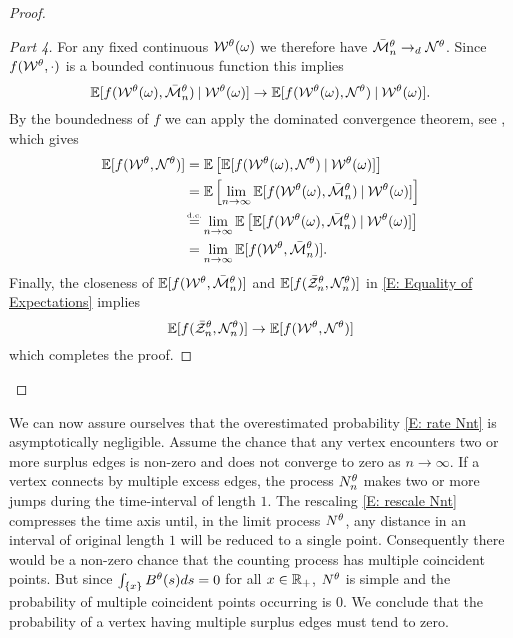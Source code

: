 \begin{proof}
\begin{proof}[Part 4]
For any fixed continuous $\mathcal{W}^{\theta}(\omega)$ we therefore have $\bar{\mathcal{M}}_n^{\theta} \rightarrow_d \mathcal{N}^{\theta}$.
Since $f(\mathcal{W}^{\theta}, \cdot)$ is a bounded continuous function this implies
\begin{equation*}
	\mathbb{E}[f(\mathcal{W}^{\theta}(\omega), \bar{\mathcal{M}}_n^{\theta}) \: | \: \mathcal{W}^{\theta}(\omega)] \rightarrow \mathbb{E}[f(\mathcal{W}^{\theta}(\omega), \mathcal{N}^{\theta})\: | \: \mathcal{W}^{\theta}(\omega)].
\end{equation*}
By the boundedness of $f$ we can apply the dominated convergence theorem, see \cite[Corollary 6.26, p.135]{Klenke.2006}, which gives
\begin{equation*}
	\begin{aligned}
	\ExpSm{f(\WtX, \NtX)}
	&= \Exp{ \ExpSm{f(\WtX(\omega), \NtX) \cond \WtX(\omega)} } \\
	&= \Exp{ \lim_{n\rightarrow\infty} \ExpSm{f(\WtX(\omega), \rNdisX) \cond \WtX(\omega)} } \\
	&\myeq{d.c.} \lim_{n\rightarrow\infty} \Exp{ \ExpSm{f(\WtX(\omega), \rNdisX) \cond \WtX(\omega)} } \\
	&= \lim_{n\rightarrow\infty} \ExpSm{ f(\WtX, \rNdisX) }.
	\end{aligned}
\end{equation*}
Finally, the closeness of $\mathbb{E}[ f(\mathcal{W}^{\theta}, \bar{\mathcal{M}}_n^{\theta}) ]$ and $\mathbb{E}[f(\bar{\mathcal{Z}}^{\theta}_n, \mathcal{N}_n^{\theta})]$ in \eqref{E: Equality of Expectations} implies
\begin{equation*}
	\mathbb{E}[f(\bar{\mathcal{Z}}^{\theta}_n, \mathcal{N}_n^{\theta})] \rightarrow \mathbb{E}[f(\mathcal{W}^{\theta}, \mathcal{N}^{\theta})]
\end{equation*}
which completes the proof.
\end{proof}
\phantom\qedhere
\end{proof}

\bigskip

We can now assure ourselves that the overestimated probability \eqref{E: rate Nnt} is asymptotically negligible.
Assume the chance that any vertex encounters two or more surplus edges is non-zero and does not converge to zero as $n \rightarrow \infty$.
If a vertex connects by multiple excess edges, the process $N_n^{\theta}$ makes two or more jumps during the time-interval of length $1$.
The rescaling \eqref{E: rescale Nnt} compresses the time axis until, in the limit process $N^{\theta}$, 
any distance in an interval of original length $1$ will be reduced to a single point.
Consequently there would be a non-zero chance that the counting process has multiple coincident points.
But since $\int_{\{x\}} B^{\theta}(s)ds = 0$ for all $x \in \mathbb{R}_+$, 
$N^{\theta}$ is simple and the probability of multiple coincident points occurring is $0$.
We conclude that the probability of a vertex having multiple surplus edges must tend to zero.


